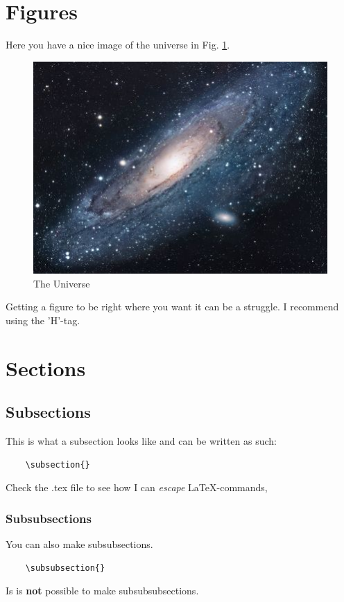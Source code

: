 \section{Figures}
Here you have a nice image of the universe in Fig. \ref{fig:universe}.
\begin{figure}[H]
    \centering
    \includegraphics[scale=1.7]{universe}
    \caption{The Universe}
    \label{fig:universe}
\end{figure}

Getting a figure to be right where you want it can be a struggle.
I recommend using the 'H'-tag.

\section{Sections}
\subsection{Subsections}
This is what a subsection looks like and can be written as such:
\begin{lstlisting}
	\subsection{}
\end{lstlisting}
Check the .tex file to see how I can \textit{escape} LaTeX-commands,
\subsubsection{Subsubsections}
You can also make subsubsections.
\begin{lstlisting}
	\subsubsection{}
\end{lstlisting}
Is is \textbf{not} possible to make subsubsubsections.


